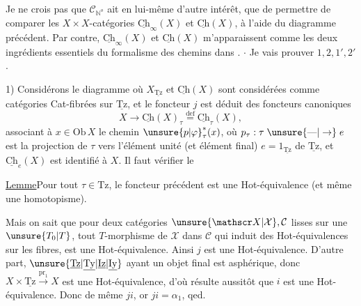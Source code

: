 Je ne crois pas que $\mathcal C_{\mathbb N^o}$ ait en lui-même d'autre intérêt, que de permettre de comparer les $X\times X$-catégories $\underline{\mathrm{Ch}}_\infty(X)$ et $\underline{\mathrm{Ch}}(X)$, à l'aide du diagramme précédent. Par contre, $\underline{\mathrm{Ch}}_\infty(X)$ et $\underline{\mathrm{Ch}}(X)$ m'apparaissent comme les deux ingrédients essentiels du formalisme des chemins dans .
$\cdot$ Je vais prouver $1,2,1',2'$.

1) Considérons le diagramme
où $X_{\underline{\mathrm{Tz}}}$ et $\underline{\mathrm{Ch}}(X)$ sont considérées comme catégories Cat-fibrées sur $\underline{\mathrm{Tz}}$, et le foncteur $j$ est déduit des foncteurs canoniques
\[
X\longrightarrow\underline{\mathrm{Ch}}(X)_\tau\overset{\mathrm{def}}{=}\underline{\mathrm{Ch}}_\tau(X),
\]
associant à  $x\in\mathrm{Ob}\,X$ le chemin  $\unsure{p|\varphi}_\tau^*(x)$, où $p_\tau:\tau\mathrel{\unsure{\text{---}|\to}}e$ est la projection de $\tau$ vers l'élément unité (et élément final) $e=1_{\underline{\mathrm{Tz}}}$ de $\underline{\mathrm{Tz}}$, et $\underline{\mathrm{Ch}}_e(X)$ est identifié à $X$. Il faut vérifier le

\uline{Lemme}\quad Pour tout $\tau\in\mathrm{Tz}$, le foncteur précédent est une Hot-équivalence (et même une  homotopisme).

Mais on sait que pour deux catégories $\unsure{\mathscr X|\mathcal X},\mathcal C$ lisses sur une  $\unsure{T_0|T}$, tout $T$-morphisme de $\mathscr X$ dans $\mathcal C$ qui induit des Hot-équivalences sur les fibres, est une Hot-équivalence. Ainsi $j$ est
une Hot-équivalence. D'autre part, $\unsure{\underline{\mathrm{Tz}}|\underline{\mathrm{Ty}}|\underline{\mathrm{Iz}}|\underline{\mathrm{Iy}}}$ ayant un objet final est asphérique, donc $X\times\underline{\mathrm{Tz}}\xrightarrow{\mathrm{pr}_1}X$ est une Hot-équivalence, d'où résulte aussitôt que $i$ est une Hot-équivalence. Donc de même $ji$, or $ji=\alpha_1$, qed.

